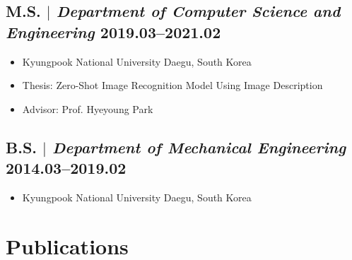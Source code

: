 \documentclass[10pt,a4paper]{article}
\begin{document}
\subsection{M.S. $|$ {\normalfont\textit{Department of Computer Science and Engineering}} \hfill 2019.03–2021.02}
\begin{itemize}
  \item Kyungpook National University \hfill Daegu, South Korea
  \item Thesis: Zero-Shot Image Recognition Model Using Image Description
  \item Advisor: Prof. Hyeyoung Park
\end{itemize}
\subsection{B.S. $|$ {\normalfont\textit{Department of Mechanical Engineering}} \hfill 2014.03–2019.02}
\begin{itemize}
  \item Kyungpook National University \hfill Daegu, South Korea
\end{itemize}

\section{Pub\color{black}lications}
\end{document}
